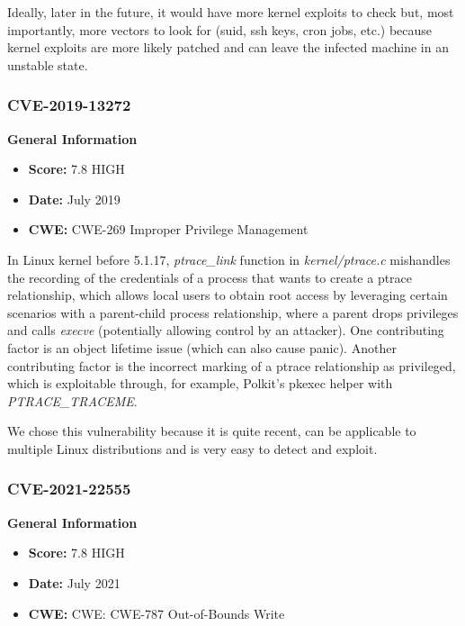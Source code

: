 Ideally, later in the future, it would have more kernel exploits to check but, most importantly, more vectors to look for (suid, ssh keys, cron jobs, etc.) because kernel exploits are more likely patched and can leave the infected machine in an unstable state.


\subsubsection{CVE-2019-13272}

\textbf{General Information}
\begin{itemize}
    \item \textbf{Score:} 7.8 HIGH 
    \item \textbf{Date:} July 2019
    \item \textbf{CWE:} CWE-269 Improper Privilege Management
\end{itemize}

In Linux kernel before 5.1.17, \textit{ptrace\_link} function in \textit{kernel/ptrace.c} mishandles the recording of the credentials of a process that wants to create a ptrace relationship, which allows local users to obtain root access by leveraging certain scenarios with a parent-child process relationship, where a parent drops privileges and calls \textit{execve} (potentially allowing control by an attacker). One contributing factor is an object lifetime issue (which can also cause panic). Another contributing factor is the incorrect marking of a ptrace relationship as privileged, which is exploitable through, for example, Polkit's pkexec helper with \textit{PTRACE\_TRACEME}.

We chose this vulnerability because it is quite recent, can be applicable to multiple Linux distributions and is very easy to detect and exploit.


\subsubsection{CVE-2021-22555}

\textbf{General Information}
\begin{itemize}
    \item \textbf{Score:} 7.8 HIGH 
    \item \textbf{Date:} July 2021
    \item \textbf{CWE:} CWE: CWE-787 Out-of-Bounds Write
\end{itemize}

